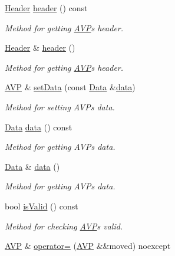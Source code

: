 \begin{DoxyCompactItemize}
\hyperlink{classDiameter_1_1AVP_1_1Header}{Header} \hyperlink{classDiameter_1_1AVP_aa968a1e25c2b83df6ea774d67534320b}{header} () const
\begin{DoxyCompactList}\small\item\em Method for getting \hyperlink{classDiameter_1_1AVP}{A\+VP}\textquotesingle{}s header. \end{DoxyCompactList}\item 
\hyperlink{classDiameter_1_1AVP_1_1Header}{Header} \& \hyperlink{classDiameter_1_1AVP_a9636f4defd3f7f65b807940658eda3b4}{header} ()
\begin{DoxyCompactList}\small\item\em Method for getting \hyperlink{classDiameter_1_1AVP}{A\+VP}\textquotesingle{}s header. \end{DoxyCompactList}\item 
\hyperlink{classDiameter_1_1AVP}{A\+VP} \& \hyperlink{classDiameter_1_1AVP_a9a16f50e09fa18523f6cc72e372949c8}{set\+Data} (const \hyperlink{classDiameter_1_1AVP_1_1Data}{Data} \&\hyperlink{classDiameter_1_1AVP_aac6b58b95eef96ad4e3320d52a1b4093}{data})
\begin{DoxyCompactList}\small\item\em Method for setting A\+V\+Ps data. \end{DoxyCompactList}\item 
\hyperlink{classDiameter_1_1AVP_1_1Data}{Data} \hyperlink{classDiameter_1_1AVP_aac6b58b95eef96ad4e3320d52a1b4093}{data} () const
\begin{DoxyCompactList}\small\item\em Method for getting A\+V\+Ps data. \end{DoxyCompactList}\item 
\hyperlink{classDiameter_1_1AVP_1_1Data}{Data} \& \hyperlink{classDiameter_1_1AVP_a49f5fad4dbdf9ffe49c16d3d975df3c5}{data} ()
\begin{DoxyCompactList}\small\item\em Method for getting A\+V\+Ps data. \end{DoxyCompactList}\item 
bool \hyperlink{classDiameter_1_1AVP_a62d6c475e55729eb6fb15e442bc9bd65}{is\+Valid} () const
\begin{DoxyCompactList}\small\item\em Method for checking \hyperlink{classDiameter_1_1AVP}{A\+VP}\textquotesingle{}s valid. \end{DoxyCompactList}\item 
\hyperlink{classDiameter_1_1AVP}{A\+VP} \& \hyperlink{classDiameter_1_1AVP_a8b3cb410b287be025497c50f0a2f95d6}{operator=} (\hyperlink{classDiameter_1_1AVP}{A\+VP} \&\&moved) noexcept

\end{DoxyCompactItemize}
